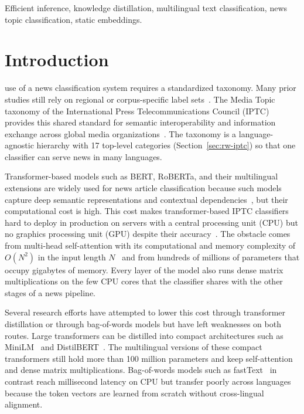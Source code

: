\documentclass{ieeeaccess}
\begin{document}
\begin{keywords}
Efficient inference, knowledge distillation, multilingual text classification, news topic classification, static embeddings.
\end{keywords}

\titlepgskip=-21pt

\maketitle


\section{Introduction}
\label{sec:introduction}
 use of a news classification system requires a standardized taxonomy. Many prior studies still rely on regional or corpus-specific label sets~\cite{razuvayevskaya2024peft,adelani2023masakhanews,mirashi2023indicnews}. The Media Topic taxonomy of the International Press Telecommunications Council (IPTC) provides this shared standard for semantic interoperability and information exchange across global media organizations~\cite{iptc2024mediatopics}. The taxonomy is a language-agnostic hierarchy with 17 top-level categories (Section~\ref{sec:rw-iptc}) so that one classifier can serve news in many languages.

Transformer-based models such as BERT, RoBERTa, and their multilingual extensions are widely used for news article classification because such models capture deep semantic representations and contextual dependencies~\cite{razuvayevskaya2024peft,sebok2025babelmachine,kuzman2025llm}, but their computational cost is high. This cost makes transformer-based IPTC classifiers hard to deploy in production on servers with a central processing unit (CPU) but no graphics processing unit (GPU) despite their accuracy~\cite{zschache2026energy,treviso2023efficient}. The obstacle comes from multi-head self-attention with its computational and memory complexity of $O(N^2)$ in the input length $N$~\cite{minaee2022dltextclf} and from hundreds of millions of parameters that occupy gigabytes of memory. Every layer of the model also runs dense matrix multiplications on the few CPU cores that the classifier shares with the other stages of a news pipeline.

Several research efforts have attempted to lower this cost through transformer distillation or through bag-of-words models but have left weaknesses on both routes. Large transformers can be distilled into compact architectures such as MiniLM~\cite{wang2021minilmv2} and DistilBERT~\cite{sanh2019distilbert}. The multilingual versions of these compact transformers still hold more than 100 million parameters and keep self-attention and dense matrix multiplications. Bag-of-words models such as fastText~\cite{joulin2017bag} in contrast reach millisecond latency on CPU but transfer poorly across languages because the token vectors are learned from scratch without cross-lingual alignment.
\end{document}
